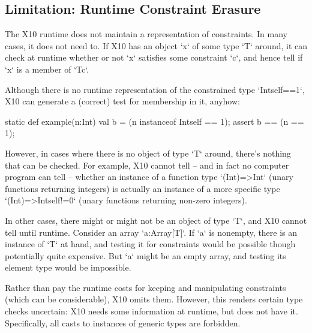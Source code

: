 \subsection{Limitation: Runtime Constraint Erasure}

The X10 runtime does not maintain a representation of constraints.
In many cases, it does not need to.
If X10 has an object \xcd`x` of some type \xcd`T` around, it can check at
runtime whether or not \xcd`x` satisfies some constraint \xcd`c`, and hence
tell if \xcd`x` is a member of \xcd`T{c}`. 

\begin{ex}
Although there is no runtime representation of the constrained type 
\xcd`Int{self==1}`, X10 can generate a (correct) test for membership in it,
anyhow: 
\begin{xten}
static def example(n:Int) {
  val b = (n instanceof Int{self == 1});
  assert b == (n == 1); 
}
\end{xten}
\end{ex}

However, in cases where there is no object of type \xcd`T` around, there's
nothing that can be checked. For example, X10 cannot tell -- and in fact no
computer program can tell --  whether an
instance of a function type \xcd`(Int)=>Int` (unary functions returning
integers) is actually an instance of a more specific type
\xcd`(Int)=>Int{self!=0}` (unary functions returning non-zero integers).

In other cases, there might or might not be an object of type \xcd`T`, and X10
cannot tell until runtime.  Consider an array \xcd`a:Array[T]`.  If \xcd`a` is
nonempty, there is an instance of \xcd`T` at hand, and testing it for
constraints would be possible though potentially quite expensive. 
But \xcd`a` might be an
empty array, and testing its element type would be impossible. 

Rather than pay the runtime costs for keeping and manipulating constraints
(which can be considerable), X10 omits them.
However, this renders certain type checks uncertain: X10 needs some
information at runtime, but does not have it.  
Specifically, all casts to instances of generic types are forbidden.  

